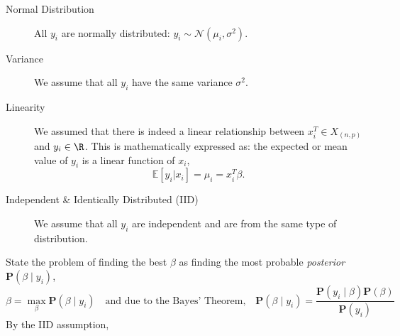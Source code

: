 \documentclass{homework}
\renewcommand\P{\mathbf{P}}
\begin{document}
\begin{description}
  \item[Normal Distribution] All $y_i$ are normally distributed:
    $y_i \sim \mathcal{N}(\mu_i, \sigma^2)$.
  \item[Variance] We assume that all $y_i$ have the same variance $\sigma^2$.
  \item[Linearity] We assumed that there is indeed a linear
    relationship between $x_i^T \in X_{(n, p)}$ and $y_i \in \R$. This
    is mathematically expressed as: the expected or mean value of
    $y_i$ is a linear function of $x_i$,
    \[
      \mathbb{E}[y_i|x_i] = \mu_i = x_{i}^{T}\beta.
    \]
  \item[Independent \& Identically Distributed (IID)] We assume that
    all $y_i$ are independent and are from the same type of
    distribution.
\end{description}
State the problem of finding the best $\beta$ as finding the most
probable \textit{posterior} $\P(\beta \mid y_i)$,
\[
  \beta = \max_\beta \P(\beta \mid y_i)
  \quad\text{and due to the Bayes' Theorem,}\quad
  \P(\beta \mid y_i) =  \frac{\P(y_i\mid \beta)\P(\beta)}{\P(y_i)}
\]
By the IID assumption,
\end{document}
